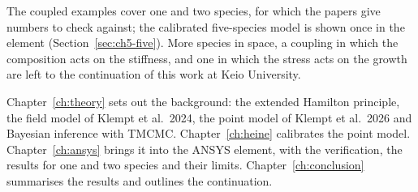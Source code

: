 The coupled examples cover one and two species, for which the papers give numbers to check against; the calibrated five-species model is shown once in the element (Section~\ref{sec:ch5-five}).
More species in space, a coupling in which the composition acts on the stiffness, and one in which the stress acts on the growth are left to the continuation of this work at Keio University.

Chapter~\ref{ch:theory} sets out the background: the extended Hamilton principle, the field model of Klempt et al.\ 2024, the point model of Klempt et al.\ 2026 and Bayesian inference with TMCMC.
Chapter~\ref{ch:heine} calibrates the point model.
Chapter~\ref{ch:ansys} brings it into the ANSYS element, with the verification, the results for one and two species and their limits.
Chapter~\ref{ch:conclusion} summarises the results and outlines the continuation.
